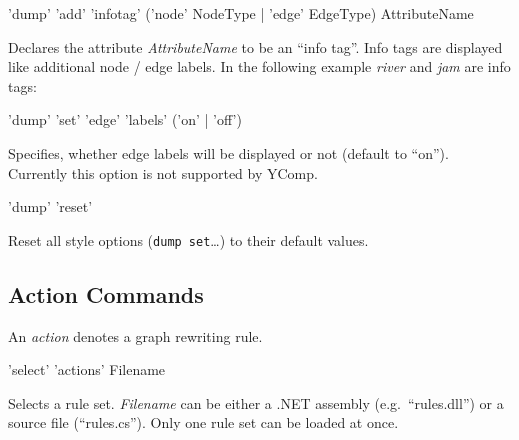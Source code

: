 \documentclass[a4paper,11pt]{report}
\begin{document}
\begin{rail}
  'dump' 'add' 'infotag' ('node' NodeType | 'edge' EdgeType) AttributeName
\end{rail}
Declares the attribute \emph{AttributeName} to be an ``info tag''. Info tags are displayed like additional node / edge labels. In the following example \emph{river} and \emph{jam} are info tags:
\begin{center}
\end{center}


\begin{rail}
  'dump' 'set' 'edge' 'labels' ('on' | 'off')
\end{rail}
Specifies, whether edge labels will be displayed or not (default to ``on''). Currently this option is not supported by YComp.

\begin{rail}
  'dump' 'reset'
\end{rail}
Reset all style options (\texttt{dump set}\dots) to their default values.

\subsection{Action Commands}
An \emph{action} denotes a graph rewriting rule.

\begin{rail}
  'select' 'actions' Filename
\end{rail}
Selects a rule set. \emph{Filename} can be either a .NET assembly (e.g.\ ``rules.dll'') or a source file (``rules.cs''). Only one rule set can be loaded at once.
\end{document}
